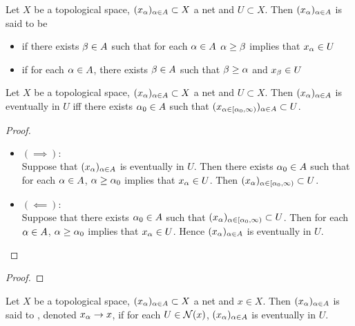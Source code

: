 \documentclass{book}
\begin{document}
	\begin{defn} 
	Let $X$ be a topological space, $(x_{\alpha})_{\alpha \in A} \subset X$ a net and $U \subset X$.
	Then $(x_{\alpha})_{\alpha \in A}$ is said to be 
	\begin{itemize}
	\item {} if there exists $\beta \in A$ such that for each $\alpha \in A$ $\alpha \geq \beta$ implies that $x_{\alpha} \in U$
	\item {}  if for each $\alpha \in A$, there exists $\beta \in A$ such that $\beta \geq \alpha $ and $x_{\beta} \in U$
	\end{itemize}
	\end{defn}

	\begin{ex} 
		Let $X$ be a topological space, $(x_{\alpha})_{\alpha \in A} \subset X$ a net and $U \subset X$. Then $(x_{\alpha})_{\alpha \in A}$ is eventually in $U$ iff there exists $\alpha_0 \in A$ such that $(x_{\alpha \in [\alpha_0, \infty)})_{\alpha \in A} \subset U$.
	\end{ex}

	\begin{proof}\
		\begin{itemize}
			\item $(\implies):$ \\
			Suppose that $(x_{\alpha})_{\alpha \in A}$ is eventually in $U$. Then there exists $\alpha_0 \in A$ such that for each $\alpha \in A$, $\alpha \geq \alpha_0$ implies that $x_{\alpha} \in U$. Then $(x_{\alpha})_{\alpha \in [\alpha_0, \infty)} \subset U$.
			\item $(\impliedby):$ \\
			Suppose that there exists $\alpha_0 \in A$ such that $(x_{\alpha})_{\alpha \in [\alpha_0, \infty)} \subset U$. Then for each $\alpha \in A$, $\alpha \geq \alpha_0$ implies that $x_{\alpha} \in U$. Hence $(x_{\alpha})_{\alpha \in A}$ is eventually in $U$.
		\end{itemize}
	\end{proof}

	\begin{ex}
	\end{ex}
	
	\begin{proof}
		
	\end{proof}
	
	\begin{defn} 
	Let $X$ be a topological space, $(x_{\alpha})_{\alpha \in A} \subset X$ a net and $x \in X$. Then $(x_{\alpha})_{\alpha \in A}$ is said to , denoted $x_{\alpha} \rightarrow x$, if for each $U \in \mathcal{N}(x)$, $(x_{\alpha})_{\alpha \in A}$ is eventually in $U$. 
	\end{defn}	
	
\end{document}
